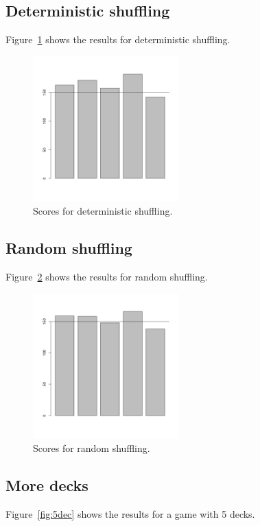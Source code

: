 \documentclass[12pt,a4paper,twocolumn]{article}
\begin{document}
\subsection*{Deterministic shuffling}
Figure~\ref{fig:det} shows the results for deterministic shuffling.

\begin{figure}[htbp]
\centering
\includegraphics[width=0.5\textwidth]{deterministic}
\caption{Scores for deterministic shuffling.\label{fig:det}}
\end{figure}

\subsection*{Random shuffling}
Figure~\ref{fig:ran} shows the results for random shuffling.

\begin{figure}[htbp]
\centering
\includegraphics[width=0.5\textwidth]{random}
\caption{Scores for random shuffling.\label{fig:ran}}
\end{figure}

\subsection*{More decks}
Figure~\ref{fig:5dec} shows the results for a game with 5 decks.
\end{document}
